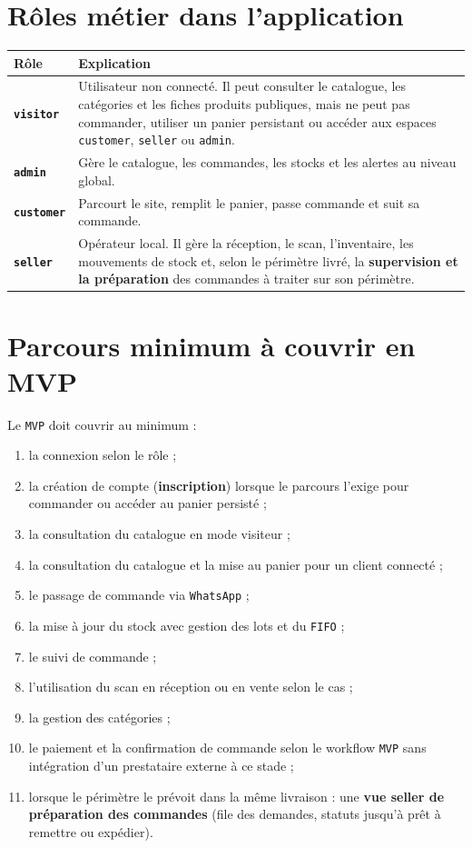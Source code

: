 \documentclass[11pt,a4paper]{scrreprt}
\newcommand{\code}[1]{\texttt{#1}}
\begin{document}
\section{Rôles métier dans l'application}
\begin{table}[h]
\centering
\begin{tabularx}{\textwidth}{>{\bfseries}p{3cm}X}
\toprule
Rôle & Explication \\
\midrule
\code{visitor} & Utilisateur non connecté. Il peut consulter le catalogue, les catégories et les fiches produits publiques, mais ne peut pas commander, utiliser un panier persistant ou accéder aux espaces \code{customer}, \code{seller} ou \code{admin}. \\
\code{admin} & Gère le catalogue, les commandes, les stocks et les alertes au niveau global. \\
\code{customer} & Parcourt le site, remplit le panier, passe commande et suit sa commande. \\
\code{seller} & Opérateur local. Il gère la réception, le scan, l'inventaire, les mouvements de stock et, selon le périmètre livré, la \textbf{supervision et la préparation} des commandes à traiter sur son périmètre. \\
\bottomrule
\end{tabularx}
\end{table}

\section{Parcours minimum à couvrir en MVP}
Le \code{MVP} doit couvrir au minimum :
\begin{enumerate}
  \item la connexion selon le rôle ;
  \item la création de compte (\textbf{inscription}) lorsque le parcours l'exige pour commander ou accéder au panier persisté ;
  \item la consultation du catalogue en mode visiteur ;
  \item la consultation du catalogue et la mise au panier pour un client connecté ;
  \item le passage de commande via \code{WhatsApp} ;
  \item la mise à jour du stock avec gestion des lots et du \code{FIFO} ;
  \item le suivi de commande ;
  \item l'utilisation du scan en réception ou en vente selon le cas ;
  \item la gestion des catégories ;
  \item le paiement et la confirmation de commande selon le workflow \code{MVP} sans intégration d'un prestataire externe à ce stade ;
  \item lorsque le périmètre le prévoit dans la même livraison : une \textbf{vue seller de préparation des commandes} (file des demandes, statuts jusqu'à prêt à remettre ou expédier).
\end{enumerate}
\end{document}
